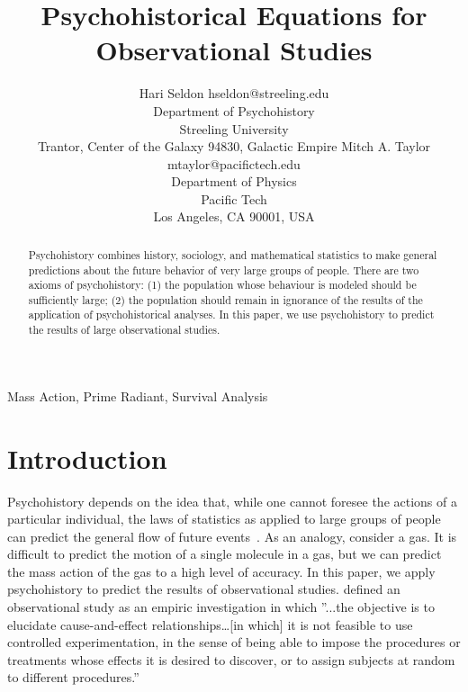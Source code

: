 \documentclass[twoside,11pt]{article}
\begin{document}
\title{Psychohistorical Equations for Observational Studies}

\author{\name Hari Seldon \email hseldon@streeling.edu \\
       \addr Department of Psychohistory\\
       Streeling University\\
       Trantor, Center of the Galaxy 94830, Galactic Empire 
       \AND
       \name Mitch A. Taylor \email mtaylor@pacifictech.edu \\
       \addr Department of Physics\\
       Pacific Tech \\
       Los Angeles, CA 90001, USA}

\maketitle

\begin{abstract}%
Psychohistory combines history, sociology, and mathematical statistics to make general predictions about the future behavior of very large groups of people. There are two axioms of psychohistory: (1) the population whose behaviour is modeled should be sufficiently large; (2) the population should remain in ignorance of the results of the application of psychohistorical analyses.  In this paper, we use psychohistory to predict the results of large observational studies.
\end{abstract}

\begin{keywords}
  Mass Action, Prime Radiant, Survival Analysis 
\end{keywords}

\section{Introduction}

Psychohistory depends on the idea that, while one cannot foresee the actions of a particular individual, the laws of statistics as applied to large groups of people can predict the general flow of future events~\citep{asimov1951}.  As an analogy, consider a gas.  It is difficult to predict the motion of a single molecule in a gas, but we can predict the mass action of the gas to a high level of accuracy.  In this paper, we apply psychohistory to predict the results of observational studies.  \citet{cochran1965} defined an observational study as an empiric investigation in which ''...the objective is to elucidate cause-and-effect relationships…[in which] it is not feasible to use controlled experimentation, in the sense of being able to impose the procedures or treatments whose effects it is desired to discover, or to assign subjects at random to different procedures.''
\end{document}
